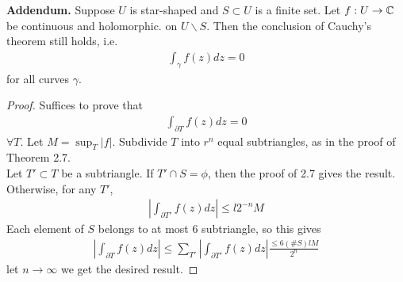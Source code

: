 \documentclass[a4paper]{article}
\begin{document}
\textbf{Addendum.} Suppose $U$ is star-shaped and $S \subset U$ is a finite set. Let $f: U \to \mathbb{C}$ be continuous and holomorphic. on $U\backslash S$. Then the conclusion of Cauchy's theorem still holds, i.e. 
\begin{equation*}
\begin{aligned}
\int_\gamma f(z) dz = 0
\end{aligned}
\end{equation*}
for all curves $\gamma$.
\begin{proof}
Suffices to prove that 
\begin{equation*}
\begin{aligned}
\int_{\partial T} f(z) dz = 0
\end{aligned}
\end{equation*}
$\forall T$. Let $M=\sup_T |f|$. Subdivide $T$ into $r^n$ equal subtriangles, as in the proof of Theorem 2.7.\\
Let $T' \subset T$ be a subtriangle. If $T' \cap S = \phi$, then the proof of 2.7 gives the result. Otherwise, for any $T'$,
\begin{equation*}
\begin{aligned}
\left|\int_{\partial T'} f(z) dz\right| \leq l 2^{-n} M
\end{aligned}
\end{equation*}
Each element of $S$ belongs to at most 6 subtriangle, so this gives
\begin{equation*}
\begin{aligned}
\left|\int_{\partial T} f(z) dz\right| \leq \sum_{T'} \left|\int_{\partial T'} f(z) dz\right| \frac{\leq 6 (\#S) lM}{2^n}
\end{aligned}
\end{equation*}
let $n \to \infty$ we get the desired result.
\end{proof}
\end{document}

